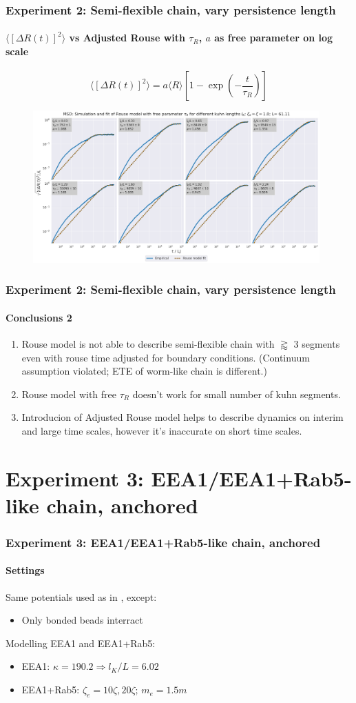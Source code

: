 \documentclass[handout]{beamer}
\newcommand{\mean}[1]{\langle #1 \rangle}
\begin{document}
\begin{frame}
    \frametitle{Experiment 2: Semi-flexible chain, vary persistence length}
    \framesubtitle{$\mean{[\Delta R(t)]^2}$ vs Adjusted Rouse with $\tau_R$, $a$ as free parameter on log scale}
    $$ \mean{[\Delta R(t)]^2} = a \mean{R} [1 - \exp(-\frac{t}{\tau_R})] $$
    \begin{figure}[h]
        \includegraphics[width=11cm]{./4-exp-delta_R-rouse_fit-tau-a_log.png}
    \end{figure}
\end{frame}

\begin{frame}
    \frametitle{Experiment 2: Semi-flexible chain, vary persistence length}
    \framesubtitle{Conclusions 2}
    \begin{enumerate}
        \item Rouse model is not able to describe semi-flexible chain with $\gtrapprox$ 3 segments
        even with rouse time adjusted for boundary conditions. 
        (Continuum assumption violated; ETE of worm-like chain is different.)
        \item Rouse model with free $\tau_R$ doesn't work for small number 
        of kuhn segments.
        \item Introducion of Adjusted Rouse model helps to describe dynamics on 
        interim and large time scales, however it's inaccurate on short time scales.
    \end{enumerate}
\end{frame}

\section{Experiment 3: EEA1/EEA1+Rab5-like chain, anchored}

\begin{frame}
    \frametitle{Experiment 3: EEA1/EEA1+Rab5-like chain, anchored}
    \framesubtitle{Settings}
    Same potentials used as in \cite[Section 2.1]{svaneborg_2020}, except:
    \begin{itemize}
        \item Only bonded beads interract
    \end{itemize}
    Modelling EEA1 and EEA1+Rab5:
    \begin{itemize}
        \item EEA1: $\kappa = 190.2 \Rightarrow l_K/L=6.02$ 
        \item EEA1+Rab5: $\zeta_e = 10\zeta, 20\zeta$; $m_e=1.5m$
    \end{itemize}
\end{frame}
\end{document}
